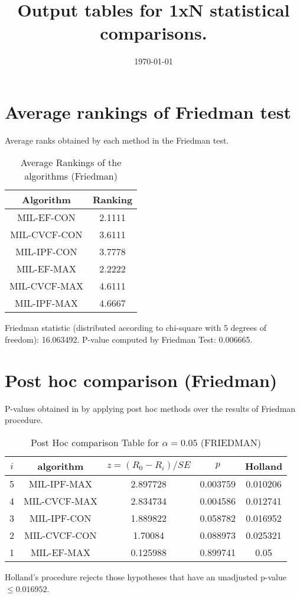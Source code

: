 \documentclass[a4paper,10pt]{article}
\title{Output tables for 1xN statistical comparisons.}
\author{}
\date{\today}
\begin{document}
\begin{landscape}
\pagestyle{empty}
\maketitle
\thispagestyle{empty}

\section{Average rankings of Friedman test}


Average ranks obtained by each method in the Friedman test.

\begin{table}[!htp]
\centering
\begin{tabular}{|c|c|}\hline
Algorithm&Ranking\\\hline
MIL-EF-CON&2.1111\\MIL-CVCF-CON&3.6111\\MIL-IPF-CON&3.7778\\MIL-EF-MAX&2.2222\\MIL-CVCF-MAX&4.6111\\MIL-IPF-MAX&4.6667\\\hline\end{tabular}
\caption{Average Rankings of the algorithms (Friedman)}
\end{table}

Friedman statistic (distributed according to chi-square with 5 degrees of freedom): 16.063492. \newline P-value computed by Friedman Test: 0.006665.\newline


\newpage

\section{Post hoc comparison (Friedman)}


P-values obtained in by applying post hoc methods over the results of Friedman procedure.

\begin{table}[!htp]
\centering\footnotesize
\begin{tabular}{ccccc}
$i$&algorithm&$z=(R_0 - R_i)/SE$&$p$&Holland\\
\hline5&MIL-IPF-MAX&2.897728&0.003759&0.010206\\4&MIL-CVCF-MAX&2.834734&0.004586&0.012741\\3&MIL-IPF-CON&1.889822&0.058782&0.016952\\2&MIL-CVCF-CON&1.70084&0.088973&0.025321\\1&MIL-EF-MAX&0.125988&0.899741&0.05\\\hline
\end{tabular}
\caption{Post Hoc comparison Table for $\alpha=0.05$ (FRIEDMAN)}
\end{table}Holland's procedure rejects those hypotheses that have an unadjusted p-value $\le0.016952$.



\end{landscape}
\end{document}
